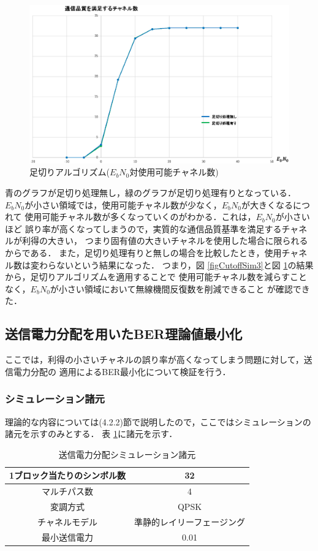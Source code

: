 \begin{figure}[h]
    \centering
    \includegraphics[width=0.95\linewidth]{chapter4/figure/CutoffSim4.eps}
    \caption{足切りアルゴリズム($E_bN_0$対使用可能チャネル数)}
    \label{figCutoffSim4}
\end{figure}

青のグラフが足切り処理無し，緑のグラフが足切り処理有りとなっている．
$E_bN_0$が小さい領域では，使用可能チャネル数が少なく，$E_bN_0$が大きくなるにつれて
使用可能チャネル数が多くなっていくのがわかる．これは，$E_bN_0$が小さいほど
誤り率が高くなってしまうので，実質的な通信品質基準を満足するチャネルが利得の大きい，
つまり固有値の大きいチャネルを使用した場合に限られるからである．
また，足切り処理有りと無しの場合を比較したとき，使用チャネル数は変わらないという結果になった．
つまり，図 \ref{figCutoffSim3}と図 \ref{figCutoffSim4}の結果から，足切りアルゴリズムを適用することで
使用可能チャネル数を減らすことなく，$E_bN_0$が小さい領域において無線機間反復数を削減できること
が確認できた．

\subsection{送信電力分配を用いたBER理論値最小化}
ここでは，利得の小さいチャネルの誤り率が高くなってしまう問題に対して，送信電力分配の
適用によるBER最小化について検証を行う．

\subsubsection{シミュレーション諸元}
理論的な内容については(4.2.2)節で説明したので，ここではシミュレーションの諸元を示すのみとする．
表 \ref{tabPcon1}に諸元を示す．

\begin{table}[h]
    \begin{tabular}{|c|c|} \hline
        1ブロック当たりのシンボル数 & 32 \\ \hline
        マルチパス数 & 4 \\ \hline
        変調方式 & QPSK \\ \hline
        チャネルモデル & 準静的レイリーフェージング \\ \hline
        最小送信電力 & 0.01 \\ \hline
    \end{tabular}
    \centering
    \caption{送信電力分配シミュレーション諸元}
    \label{tabPcon1}
\end{table}

